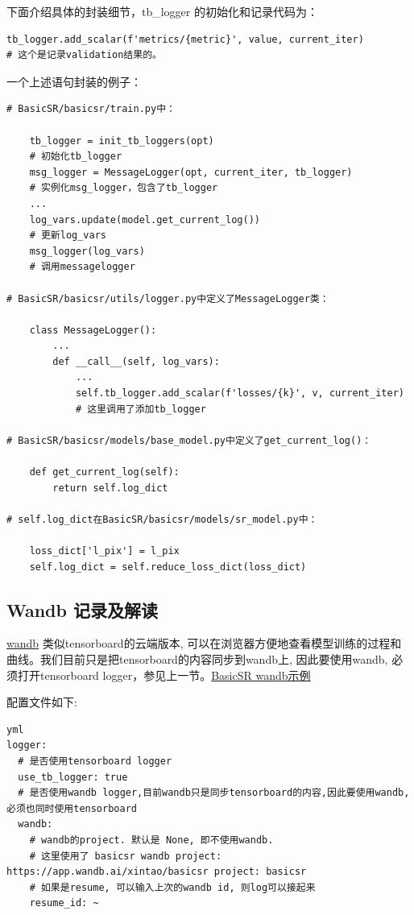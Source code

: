 \documentclass[../main.tex]{subfiles}
\begin{document}
下面介绍具体的封装细节，tb\_logger 的初始化和记录代码为：

\begin{verbatim}
tb_logger.add_scalar(f'metrics/{metric}', value, current_iter)
# 这个是记录validation结果的。
\end{verbatim}

一个上述语句封装的例子：

\begin{verbatim}
# BasicSR/basicsr/train.py中：

    tb_logger = init_tb_loggers(opt)
    # 初始化tb_logger
    msg_logger = MessageLogger(opt, current_iter, tb_logger)
    # 实例化msg_logger，包含了tb_logger
    ...
    log_vars.update(model.get_current_log())
    # 更新log_vars
    msg_logger(log_vars)
    # 调用messagelogger

# BasicSR/basicsr/utils/logger.py中定义了MessageLogger类：

    class MessageLogger():
        ...
        def __call__(self, log_vars):
            ...
            self.tb_logger.add_scalar(f'losses/{k}', v, current_iter)
            # 这里调用了添加tb_logger

# BasicSR/basicsr/models/base_model.py中定义了get_current_log()：

    def get_current_log(self):
        return self.log_dict

# self.log_dict在BasicSR/basicsr/models/sr_model.py中：

    loss_dict['l_pix'] = l_pix
    self.log_dict = self.reduce_loss_dict(loss_dict)
\end{verbatim}



\subsection{Wandb 记录及解读}

\href{https://www.wandb.com/}{wandb} 类似tensorboard的云端版本, 可以在浏览器方便地查看模型训练的过程和曲线。我们目前只是把tensorboard的内容同步到wandb上, 因此要使用wandb, 必须打开tensorboard logger，参见上一节。\href{https://wandb.ai/xintao/basicsr?workspace=user-}{BasicSR wandb示例}

配置文件如下:
\begin{verbatim}
yml
logger:
  # 是否使用tensorboard logger
  use_tb_logger: true
  # 是否使用wandb logger,目前wandb只是同步tensorboard的内容,因此要使用wandb, 必须也同时使用tensorboard
  wandb:
    # wandb的project. 默认是 None, 即不使用wandb.
    # 这里使用了 basicsr wandb project: https://app.wandb.ai/xintao/basicsr project: basicsr
    # 如果是resume, 可以输入上次的wandb id, 则log可以接起来
    resume_id: ~
\end{verbatim}
\end{document}
